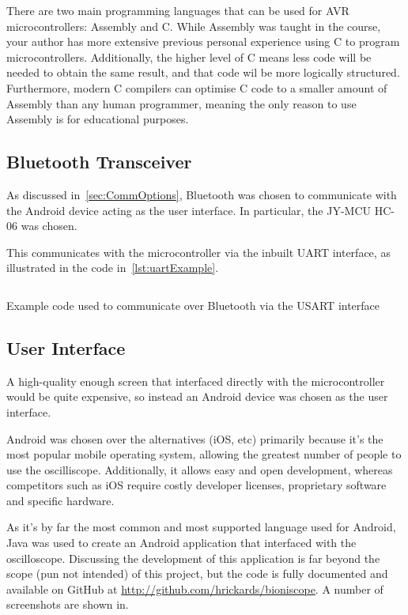 There are two main programming languages that can be used for AVR
microcontrollers: Assembly and C. While Assembly was taught in the course, your
author has more extensive previous personal experience using C to program
microcontrollers. Additionally, the higher level of C means less code will be
needed to obtain the same result, and that code wil be more logically
structured. Furthermore, modern C compilers can optimise C code to a smaller
amount of Assembly than any human programmer, meaning the only reason to use
Assembly is for educational purposes.

\subsection{Bluetooth Transceiver}
\label{sec:wireless_transceiver}

As discussed in~\cref{sec:CommOptions}, Bluetooth was chosen to communicate with
the Android device acting as the user interface. In particular, the JY-MCU HC-06
was chosen.

This communicates with the microcontroller via the inbuilt UART interface, as
illustrated in the code in~\cref{lst:uartExample}.

\begin{listing}[H]
  \inputminted{c}{code/USART.c}
  \caption{Example code used to communicate over Bluetooth via the USART
  interface}
  \label{lst:uartExample}
\end{listing}

\subsection{User Interface}
\label{sec:user_interface}

A high-quality enough screen that interfaced directly with the microcontroller
would be quite expensive, so instead an Android device was chosen as the user
interface.

Android was chosen over the alternatives (iOS, etc) primarily because it's the
most popular mobile operating system, allowing the greatest number of people to
use the oscilliscope. Additionally, it allows easy and open development, whereas
competitors such as iOS require costly developer licenses, proprietary software
and specific hardware.

As it's by far the most common and most supported language used for Android,
Java was used to create an Android application that interfaced with the
oscilloscope. Discussing the development of this application is far beyond the
scope (pun not intended) of this project, but the code is fully documented and
available on GitHub at \url{http://github.com/hrickards/bioniscope}. A number of
screenshots are shown in.

